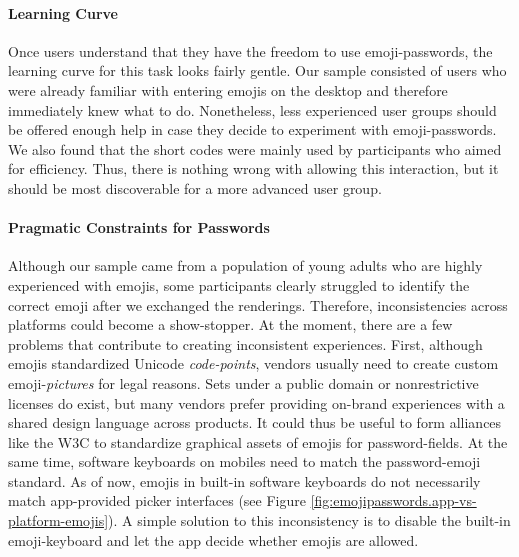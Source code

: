 \paragraph{Learning Curve} Once users understand that they have the freedom to use emoji-passwords, the learning curve for this task looks fairly gentle. Our sample consisted of users who were already familiar with entering emojis on the desktop and therefore immediately knew what to do. Nonetheless, less experienced user groups should be offered enough help in case they decide to experiment with emoji-passwords. We also found that the short codes were mainly used by participants who aimed for efficiency. Thus, there is nothing wrong with allowing this interaction, but it should be most discoverable for a more advanced user group. 


\paragraph{Pragmatic Constraints for Passwords}\label{sec:emojipasswords:unique-constraints} 

Although our sample came from a population of young adults who are highly experienced with emojis, some participants clearly struggled to identify the correct emoji after we exchanged the renderings. Therefore, inconsistencies across platforms could become a show-stopper. At the moment, there are a few problems that contribute to creating inconsistent experiences. 
First, although emojis standardized Unicode \textit{code-points}, vendors usually need to create custom emoji-\textit{pictures} for legal reasons. Sets under a public domain or nonrestrictive licenses do exist, but many vendors prefer providing on-brand experiences with a shared design language across products. It could thus be useful to form alliances like the \gls{W3C} to standardize graphical assets of emojis for password-fields. At the same time, software keyboards on mobiles need to match the password-emoji standard. As of now, emojis in built-in software keyboards do not necessarily match app-provided picker interfaces (see Figure \ref{fig:emojipasswords.app-vs-platform-emojis}). A simple solution to this inconsistency is to disable the built-in emoji-keyboard and let the app decide whether emojis are allowed.

